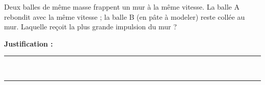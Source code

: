 Deux balles de même masse frappent un mur à la même vitesse. La balle A rebondit avec la même vitesse ; la balle B (en pâte à modeler) reste collée au mur. Laquelle reçoit la plus grande impulsion du mur ?

\choices

\noindent\textbf{Justification :} \hrulefill \\[2.5ex]
\rule{\linewidth}{0.4pt} \\[2.5ex]
\rule{\linewidth}{0.4pt}
\vfill
